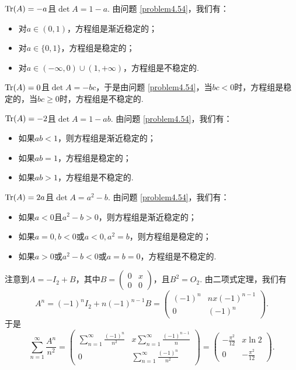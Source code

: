 \begin{solution}
  $\operatorname{Tr}(A)=-a$且$\det A=1-a$. 由问题 \ref{problem4.54}，我们有：
  \begin{itemize}
    \item 对$a\in(0,1)$，方程组是渐近稳定的；
    \item 对$a\in\{0,1\}$，方程组是稳定的；
    \item 对$a\in(-\infty,0)\cup(1,+\infty)$，方程组是不稳定的.
  \end{itemize}
\end{solution}

\begin{solution}
  $\operatorname{Tr}(A)=0$且$\det A=-bc$，于是由问题 \ref{problem4.54}，当$bc<0$时，方程组是稳定的，当$bc\ge0$时，方程组是不稳定的.
\end{solution}

\begin{solution}
  $\operatorname{Tr}(A)=-2$且$\det A=1-ab$. 由问题 \ref{problem4.54}，我们有：
  \begin{itemize}
    \item 如果$ab<1$，则方程组是渐近稳定的；
    \item 如果$ab=1$，方程组是稳定的；
    \item 如果$ab>1$，方程组是不稳定的.
  \end{itemize}
\end{solution}

\begin{solution}
  $\operatorname{Tr}(A)=2a$且$\det A=a^2-b$. 由问题 \ref{problem4.54}，我们有：
  \begin{itemize}
    \item 如果$a<0$且$a^2-b>0$，则方程组是渐近稳定的；
    \item 如果$a=0,b<0$或$a<0,a^2=b$，则方程组是稳定的；
    \item 如果$a>0$或$a^2-b<0$或$a=b=0$，方程组是不稳定的.
  \end{itemize}
\end{solution}

\begin{solution}
  注意到$A=-I_2+B$，其中$B=\begin{pmatrix}
    0 & x \\
    0 & 0
  \end{pmatrix}$，且$B^2=O_2$. 由二项式定理，我们有
  \[
    A^n = (-1)^nI_2 + n(-1)^{n-1}B = \begin{pmatrix}
      (-1)^n & nx(-1)^{n-1} \\
      0 & (-1)^n
    \end{pmatrix}.
  \]
  于是
  \[
    \sum_{n=1}^\infty \frac{A^n}{n^2} = \begin{pmatrix}
      \sum_{n=1}^\infty \frac{(-1)^n}{n^2} & x \sum_{n=1}^\infty \frac{(-1)^{n-1}}n \\
      0 & \sum_{n=1}^\infty \frac{(-1)^n}{n^2}
    \end{pmatrix} =
    \begin{pmatrix}
      -\frac{\pi^2}{12} & x\ln2 \\
      0 & -\frac{\pi^2}{12}
    \end{pmatrix}.
  \]
\end{solution}

